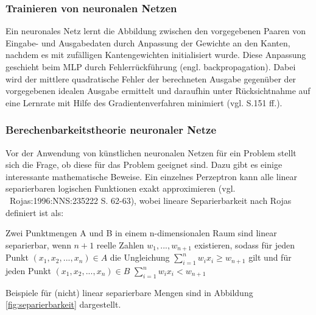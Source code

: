 \documentclass[
	12pt,
	a4paper,
	BCOR10mm,
	DIV14,
	listof=totoc,
	bibliography=totoc,
	headsepline
]{scrreprt}
\begin{document}
\subsubsection{Trainieren von neuronalen Netzen}
Ein neuronales Netz lernt die Abbildung zwischen den vorgegebenen Paaren von Eingabe- und Ausgabedaten durch Anpassung der Gewichte an den Kanten, nachdem es mit zufälligen Kantengewichten initialisiert wurde.
Diese Anpassung geschieht beim MLP durch Fehlerrückführung (engl. backpropagation). Dabei wird der mittlere quadratische Fehler der berechneten Ausgabe gegenüber der vorgegebenen idealen Ausgabe ermittelt und daraufhin unter Rücksichtnahme auf eine Lernrate mit Hilfe des Gradientenverfahren minimiert (vgl. \cite{Rojas:1996:NNS:235222} S.151 ff.).

\subsubsection{Berechenbarkeitstheorie neuronaler Netze}
Vor der Anwendung von künstlichen neuronalen Netzen für ein Problem stellt sich die Frage, ob diese für das Problem geeignet sind. Dazu gibt es einige interessante mathematische Beweise.
Ein einzelnes Perzeptron kann alle linear separierbaren logischen Funktionen exakt approximieren (vgl. \
{Rojas:1996:NNS:235222} S. 62-63), wobei lineare Separierbarkeit nach Rojas definiert ist als:

Zwei Punktmengen A und B in einem n-dimensionalen Raum sind linear separierbar, wenn $n + 1$ reelle Zahlen $w_1,...,w_{n+1}$ existieren, sodass für jeden Punkt $(x_1,x_2,...,x_n) \in A$ die Ungleichung $\sum_{i=1}^{n} w_ix_i \ge w_{n+1}$ gilt und für jeden Punkt $(x_1,x_2,...,x_n) \in B$ $\sum_{i=1}^{n} w_ix_i < w_{n+1}$\medskip

Beispiele für (nicht) linear separierbare Mengen sind in Abbildung \ref{fig:separierbarkeit} dargestellt.
\end{document}
